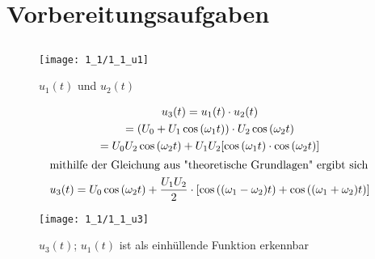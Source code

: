 \documentclass[a4paper, 12pt]{article}
\begin{document}
  
  \clearpage
  \setcounter{page}{1}



\section{Vorbereitungsaufgaben}

\subsection{}

\begin{figure}[H]
  \texttt{[image: 1\_1/1\_1\_u1]}
  \caption{$u_1(t)$ und $u_2(t)$}
\end{figure}

\begin{gather*}
  u_3(t) = u_1(t) \cdot u_2(t)\\
  = (U_0 + U_1 \cos{(\omega_1 t)}) \cdot U_2 \cos{(\omega_2 t)}\\
  = U_0 U_2 \cos{(\omega_2 t)} + U_1 U_2 [ \cos{(\omega_1 t)} \cdot \cos{(
    \omega_2 t)} ]\\
  \intertext{mithilfe der Gleichung aus "theoretische Grundlagen"\ ergibt
    sich}
  u_3(t)= U_0 \cos{(\omega_2 t)} + \frac{U_1 U_2}{2} \cdot \left[
    \cos{((\omega_1 - \omega_2)t)} + \cos{((\omega_1 + \omega_2) t)} \right]
\end{gather*}

\begin{figure}[H]
  \texttt{[image: 1\_1/1\_1\_u3]}
  \caption{$u_3(t)$; $u_1(t)$ ist als einhüllende Funktion erkennbar}
\end{figure}
\end{document}
